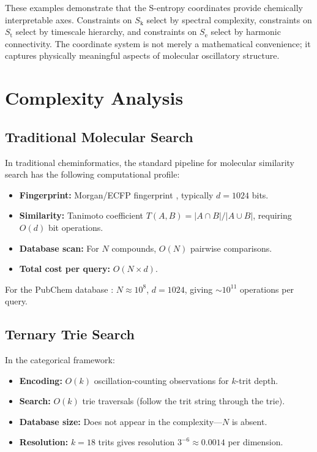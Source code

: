 \documentclass[11pt,a4paper]{article}
\theoremstyle{definition}
\theoremstyle{remark}
\newcommand{\Sk}{S_{\mathrm{k}}}
\newcommand{\St}{S_{\mathrm{t}}}
\newcommand{\Se}{S_{\mathrm{e}}}
\begin{document}
These examples demonstrate that the S-entropy coordinates provide chemically interpretable axes. Constraints on $\Sk$ select by spectral complexity, constraints on $\St$ select by timescale hierarchy, and constraints on $\Se$ select by harmonic connectivity. The coordinate system is not merely a mathematical convenience; it captures physically meaningful aspects of molecular oscillatory structure.

\section{Complexity Analysis}
\label{sec:complexity}

\subsection{Traditional Molecular Search}

In traditional cheminformatics, the standard pipeline for molecular similarity search has the following computational profile:

\begin{itemize}[nosep]
\item \textbf{Fingerprint:} Morgan/ECFP fingerprint \citep{rogers2010}, typically $d = 1024$ bits.
\item \textbf{Similarity:} Tanimoto coefficient $T(A,B) = |A \cap B|/|A \cup B|$, requiring $O(d)$ bit operations.
\item \textbf{Database scan:} For $N$ compounds, $O(N)$ pairwise comparisons.
\item \textbf{Total cost per query:} $O(N \times d)$.
\end{itemize}

For the PubChem database \citep{kim2023}: $N \approx 10^8$, $d = 1024$, giving $\sim 10^{11}$ operations per query.

\subsection{Ternary Trie Search}

In the categorical framework:

\begin{itemize}[nosep]
\item \textbf{Encoding:} $O(k)$ oscillation-counting observations for $k$-trit depth.
\item \textbf{Search:} $O(k)$ trie traversals (follow the trit string through the trie).
\item \textbf{Database size:} Does not appear in the complexity---$N$ is absent.
\item \textbf{Resolution:} $k = 18$ trits gives resolution $3^{-6} \approx 0.0014$ per dimension.
\end{itemize}
\end{document}
